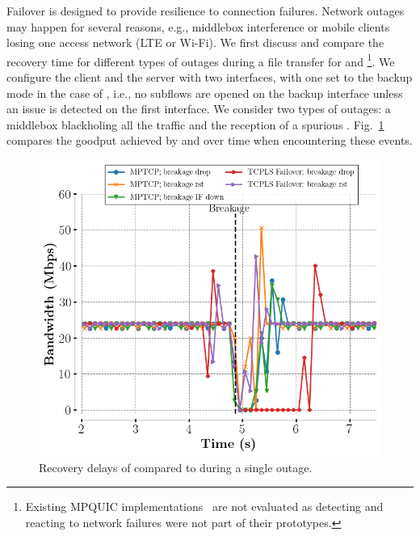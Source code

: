 Failover is designed to provide resilience to \tcpls connection failures. Network outages may happen for several reasons, e.g., middlebox interference or mobile clients losing one access network (LTE or Wi-Fi). We first discuss and compare the recovery time for different types of outages during a file transfer for \tcpls and \mptcp \footnote{Existing MPQUIC implementations~\cite{de2017multipath,de2019pluginizing} are not evaluated as detecting and reacting to network failures were not part of their prototypes.}.
We configure the client and the server with two interfaces, with one set to the
backup mode in the case of \mptcp, i.e., no subflows are opened on the backup
interface unless an issue is detected on the first interface. We consider two
types of outages: a middlebox blackholing all the traffic and the reception of a
spurious \rst. Fig.~\ref{fig:recovery} compares the goodput achieved by \mptcp and \tcpls over time when encountering these events.

\begin{figure}[!t]
  \begin{center}
    \includegraphics[width=\columnwidth]{figures/breakage_analysis.png}
  \end{center}
  \caption{Recovery delays of \tcpls compared to \mptcp during a single outage.}
  \label{fig:recovery}
\end{figure}

